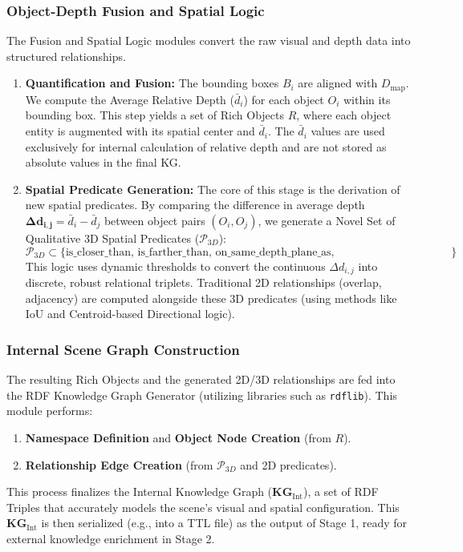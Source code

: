 \documentclass[runningheads,14pt]{llncs}
\begin{document}
\subsubsection{Object-Depth Fusion and Spatial Logic}
The Fusion and Spatial Logic modules convert the raw visual and depth data into structured relationships.
\begin{enumerate}
    \item \textbf{Quantification and Fusion:} The bounding boxes $B_i$ are aligned with $D_{\text{map}}$. We compute the Average Relative Depth ($\bar{d}_i$) for each object $O_i$ within its bounding box. This step yields a set of Rich Objects $R$, where each object entity is augmented with its spatial center and $\bar{d}_i$. The $\bar{d}_i$ values are used exclusively for internal calculation of relative depth and are not stored as absolute values in the final KG.
    \item \textbf{Spatial Predicate Generation:} The core of this stage is the derivation of new spatial predicates. By comparing the difference in average depth $\mathbf{\Delta d_{i,j}} = \bar{d}_i - \bar{d}_j$ between object pairs $(O_i, O_j)$, we generate a Novel Set of Qualitative 3D Spatial Predicates ($\mathcal{P}_{3D}$):
    $$\mathcal{P}_{3D} \subset \{\text{is\_closer\_than, is\_farther\_than, on\_same\_depth\_plane\_as, in\_immediate\_foreground, etc.}\}$$
    This logic uses dynamic thresholds to convert the continuous $\Delta d_{i,j}$ into discrete, robust relational triplets. Traditional 2D relationships (overlap, adjacency) are computed alongside these 3D predicates (using methods like IoU and Centroid-based Directional logic).
\end{enumerate}

\subsubsection{Internal Scene Graph Construction}
The resulting Rich Objects and the generated 2D/3D relationships are fed into the RDF Knowledge Graph Generator (utilizing libraries such as \texttt{rdflib}). This module performs:
\begin{enumerate}
    \item \textbf{Namespace Definition} and \textbf{Object Node Creation} (from $R$).
    \item \textbf{Relationship Edge Creation} (from $\mathcal{P}_{3D}$ and 2D predicates).
\end{enumerate}
This process finalizes the Internal Knowledge Graph ($\mathbf{KG}_{\text{Int}}$), a set of RDF Triples that accurately models the scene's visual and spatial configuration. This $\mathbf{KG}_{\text{Int}}$ is then serialized (e.g., into a TTL file) as the output of Stage 1, ready for external knowledge enrichment in Stage 2.
\end{document}
